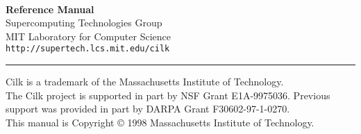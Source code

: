 \documentclass[11pt,twoside]{report}
\begin{document}
\begin{titlepage}

\begin{center}
\vspace*{4cm}
{\huge
\textbf{\sysnameversion{}\\[.5cm]
Reference Manual}}\\[.8cm]

{\large
Supercomputing Technologies Group\\
MIT Laboratory for Computer Science\\[.3cm]
\texttt{http://supertech.lcs.mit.edu/cilk}\\[.6cm]
}

\vfill
\hrule
\vspace{.4cm}
{\small Cilk is a trademark of the Massachusetts Institute of
Technology.\\
The Cilk project is supported in part by NSF Grant E1A-9975036.
Previous support was provided in part by DARPA Grant
F30602-97-1-0270.\\
This manual is Copyright \copyright{} 1998 Massachusetts Institute of
Technology.}
\end{center}
\end{titlepage}

\doclearpage

\pagestyle{headings}





\cleardoublepage


\tableofcontents
\cleardoublepage













\cleardoublepage

\appendix




\nocite{Blumofe92}


\end{document}
